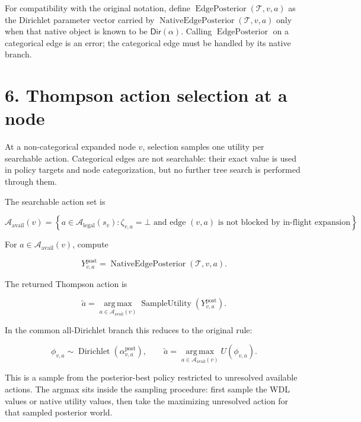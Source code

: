 \documentclass[11pt]{article}
\newcommand{\Dir}{\operatorname{Dirichlet}}
\newcommand{\argmax}{\operatorname*{arg\,max}}
\newcommand{\Tree}{\mathcal{T}}
\newcommand{\Legal}{\mathcal{A}_{\mathrm{legal}}}
\newcommand{\Available}{\mathcal{A}_{\mathrm{avail}}}
\newcommand{\Utility}{U}
\newcommand{\EdgePosterior}{\operatorname{EdgePosterior}}
\newcommand{\DirObj}{\mathsf{Dir}}
\newcommand{\SampleUtility}{\operatorname{SampleUtility}}
\newcommand{\NativeEdgePosterior}{\operatorname{NativeEdgePosterior}}
\begin{document}
For compatibility with the original notation, define
\(\EdgePosterior(\Tree,v,a)\) as the Dirichlet parameter vector carried by
\(\NativeEdgePosterior(\Tree,v,a)\) only when that native object is known to be
\(\DirObj(\alpha)\). Calling \(\EdgePosterior\) on a categorical edge is an error;
the categorical edge must be handled by its native branch.

\section*{6. Thompson action selection at a node}

At a non-categorical expanded node \(v\), selection samples one utility per
searchable action. Categorical edges are not searchable: their exact value is
used in policy targets and node categorization, but no further tree search is
performed through them.

The searchable action set is

\[
\Available(v)
=
\left\{
 a\in\Legal(s_v):
 \zeta_{v,a}=\bot
 \text{ and edge }(v,a)\text{ is not blocked by in-flight expansion}
\right\}.
\]

For \(a\in\Available(v)\), compute

\[
Y^{\mathrm{post}}_{v,a}
=
\NativeEdgePosterior(\Tree,v,a).
\]

The returned Thompson action is

\[
\tilde a
=
\argmax_{a \in \Available(v)}
\SampleUtility(Y^{\mathrm{post}}_{v,a}).
\]

In the common all-Dirichlet branch this reduces to the original rule:

\[
\phi_{v,a}
\sim
\Dir
\left(
\alpha^{\mathrm{post}}_{v,a}
\right),
\qquad
\tilde a
=
\argmax_{a \in \Available(v)}
\Utility(\phi_{v,a}).
\]

This is a sample from the posterior-best policy restricted to unresolved
available actions. The argmax sits inside the sampling procedure: first sample
the WDL values or native utility values, then take the maximizing unresolved
action for that sampled posterior world.
\end{document}
